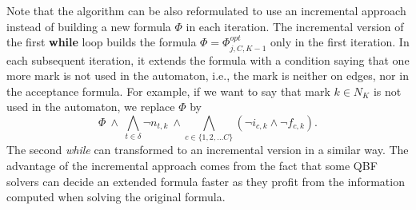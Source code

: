 \documentclass[a4paper,UKenglish,cleveref, autoref, thm-restate]{lipics-v2021}
\begin{document}
Note that the algorithm can be also reformulated to use an incremental
approach instead of building a new formula $\Phi$ in each iteration.
The incremental version of the first \textbf{while} loop builds the formula
$\Phi=\Phi^\mathit{opt}_{j,C,K{-}1}$ only in the first iteration. In
each subsequent iteration, it extends the formula with a condition
saying that one more mark is not used in the automaton, i.e., the mark
is neither on edges, nor in the acceptance formula. For example, if we
want to say that mark $k\in N_K$ is not used in the automaton, we replace
$\Phi$ by
\[
  \Phi~\wedge~\bigwedge_{t\in\delta}\neg n_{t,k}~\wedge\bigwedge_{c\in\{1,2,\ldots C\}}(\neg i_{c,k}\wedge\neg f_{c,k}).
\]
The second \emph{while} can transformed to an incremental version in a
similar way. The advantage of the incremental approach comes from the
fact that some QBF solvers can decide an extended formula faster as
they profit from the information computed when solving the original
formula.
\end{document}
